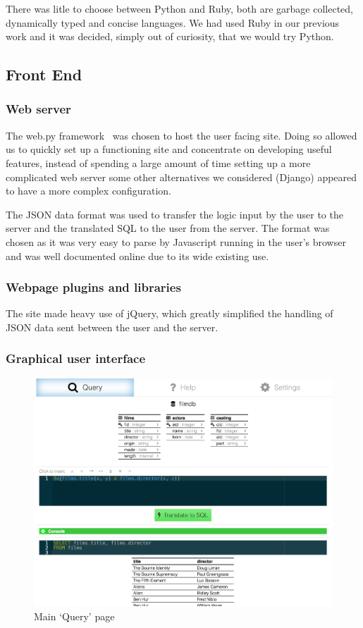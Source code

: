 \documentclass[a4paper, 11pt]{article}
\begin{document}
  There was litle to choose between Python and Ruby, both are garbage
  collected, dynamically typed and concise languages. We had used Ruby
  in our previous work and it was decided, simply out of curiosity,
  that we would try Python.
  
  \subsection{Front End}
    \subsubsection{Web server}
      The web.py framework~\cite{webpy} was chosen to host the
      user facing site. Doing so allowed us to quickly set up a functioning site
      and concentrate on developing useful features, instead of spending a large
      amount of time setting up a more complicated web server some other
      alternatives we considered (Django) appeared to have a more complex
      configuration.

      The JSON data format was used to transfer the logic input by the user to the
      server and the translated SQL to the user from the server. The format was
      chosen as it was very easy to parse by Javascript running in the user's
      browser and was well documented online due to its wide existing use.

    \subsubsection{Webpage plugins and libraries}
      The site made heavy use of jQuery, which greatly simplified the handling
      of JSON data sent between the user and the server.

    \subsubsection{Graphical user interface}
      \begin{figure}[h!]
        \includegraphics[width=\textwidth]{images/site_query.png}
        \caption{Main `Query' page}
      \end{figure}
\end{document}
